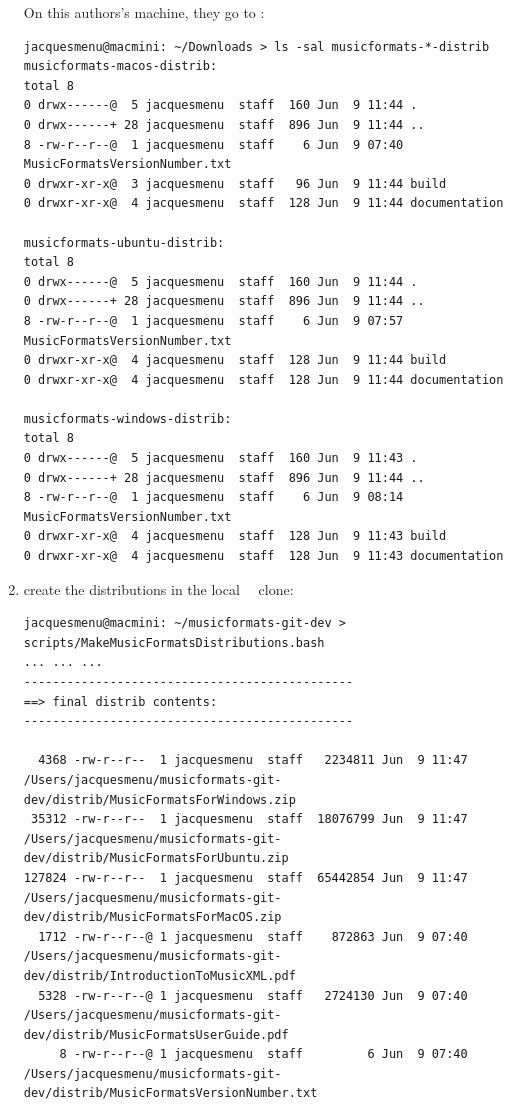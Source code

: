 \begin{enumerate}
On this authors's machine, they go to :
\begin{lstlisting}[language=Terminal]
jacquesmenu@macmini: ~/Downloads > ls -sal musicformats-*-distrib
musicformats-macos-distrib:
total 8
0 drwx------@  5 jacquesmenu  staff  160 Jun  9 11:44 .
0 drwx------+ 28 jacquesmenu  staff  896 Jun  9 11:44 ..
8 -rw-r--r--@  1 jacquesmenu  staff    6 Jun  9 07:40 MusicFormatsVersionNumber.txt
0 drwxr-xr-x@  3 jacquesmenu  staff   96 Jun  9 11:44 build
0 drwxr-xr-x@  4 jacquesmenu  staff  128 Jun  9 11:44 documentation

musicformats-ubuntu-distrib:
total 8
0 drwx------@  5 jacquesmenu  staff  160 Jun  9 11:44 .
0 drwx------+ 28 jacquesmenu  staff  896 Jun  9 11:44 ..
8 -rw-r--r--@  1 jacquesmenu  staff    6 Jun  9 07:57 MusicFormatsVersionNumber.txt
0 drwxr-xr-x@  4 jacquesmenu  staff  128 Jun  9 11:44 build
0 drwxr-xr-x@  4 jacquesmenu  staff  128 Jun  9 11:44 documentation

musicformats-windows-distrib:
total 8
0 drwx------@  5 jacquesmenu  staff  160 Jun  9 11:43 .
0 drwx------+ 28 jacquesmenu  staff  896 Jun  9 11:44 ..
8 -rw-r--r--@  1 jacquesmenu  staff    6 Jun  9 08:14 MusicFormatsVersionNumber.txt
0 drwxr-xr-x@  4 jacquesmenu  staff  128 Jun  9 11:43 build
0 drwxr-xr-x@  4 jacquesmenu  staff  128 Jun  9 11:43 documentation
\end{lstlisting}


\item create the distributions in the local \mf\ \repo\ clone:
\begin{lstlisting}[language=TerminalSmall]
jacquesmenu@macmini: ~/musicformats-git-dev > scripts/MakeMusicFormatsDistributions.bash
... ... ...
----------------------------------------------
==> final distrib contents:
----------------------------------------------

  4368 -rw-r--r--  1 jacquesmenu  staff   2234811 Jun  9 11:47 /Users/jacquesmenu/musicformats-git-dev/distrib/MusicFormatsForWindows.zip
 35312 -rw-r--r--  1 jacquesmenu  staff  18076799 Jun  9 11:47 /Users/jacquesmenu/musicformats-git-dev/distrib/MusicFormatsForUbuntu.zip
127824 -rw-r--r--  1 jacquesmenu  staff  65442854 Jun  9 11:47 /Users/jacquesmenu/musicformats-git-dev/distrib/MusicFormatsForMacOS.zip
  1712 -rw-r--r--@ 1 jacquesmenu  staff    872863 Jun  9 07:40 /Users/jacquesmenu/musicformats-git-dev/distrib/IntroductionToMusicXML.pdf
  5328 -rw-r--r--@ 1 jacquesmenu  staff   2724130 Jun  9 07:40 /Users/jacquesmenu/musicformats-git-dev/distrib/MusicFormatsUserGuide.pdf
     8 -rw-r--r--@ 1 jacquesmenu  staff         6 Jun  9 07:40 /Users/jacquesmenu/musicformats-git-dev/distrib/MusicFormatsVersionNumber.txt


\end{lstlisting}
\end{enumerate}
